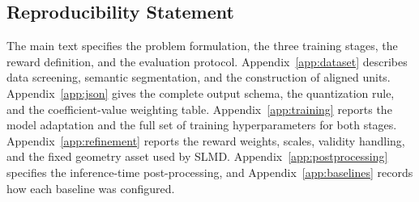 \subsection*{Reproducibility Statement}

The main text specifies the problem formulation, the three training stages, the reward definition, and the evaluation protocol. Appendix~\ref{app:dataset} describes data screening, semantic segmentation, and the construction of aligned units. Appendix~\ref{app:json} gives the complete output schema, the quantization rule, and the coefficient-value weighting table. Appendix~\ref{app:training} reports the model adaptation and the full set of training hyperparameters for both stages. Appendix~\ref{app:refinement} reports the reward weights, scales, validity handling, and the fixed geometry asset used by SLMD. Appendix~\ref{app:postprocessing} specifies the inference-time post-processing, and Appendix~\ref{app:baselines} records how each baseline was configured.
